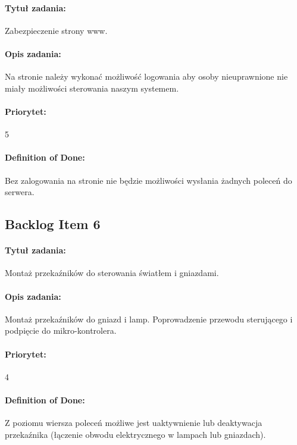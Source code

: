 	\paragraph{Tytuł zadania:}
	Zabezpieczenie strony www.
	
	\paragraph{Opis zadania:}
	Na stronie należy wykonać możliwość logowania aby osoby nieuprawnione nie miały możliwości sterowania naszym systemem.
	
	\paragraph{Priorytet:}
	5
	
	\paragraph{Definition of Done:}
	Bez zalogowania na stronie nie będzie możliwości wysłania żadnych poleceń do serwera.

	
	\subsection{Backlog Item 6}
	\paragraph{Tytuł zadania:} 
	Montaż przekaźników do sterowania światłem i gniazdami.
	
	\paragraph{Opis zadania:} 
	Montaż przekaźników do gniazd i lamp. Poprowadzenie przewodu sterującego i podpięcie do mikro-kontrolera.
	
	\paragraph{Priorytet:}
	4
	
	\paragraph{Definition of Done:}
	Z poziomu wiersza poleceń możliwe jest uaktywnienie lub deaktywacja przekaźnika (łączenie obwodu elektrycznego w lampach lub gniazdach).

